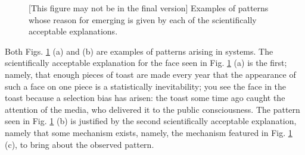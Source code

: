 \begin{figure}[h]
\caption{[This figure may not be in the final version] Examples of patterns whose reason for emerging is given by each of the scientifically acceptable explanations. } 
\label{fig:toast}
\end{figure}
Both Figs. \ref{fig:toast} (a) and (b) are examples of patterns arising in systems. The scientifically acceptable explanation for the face seen in Fig. \ref{fig:toast} (a) is the first; namely, that enough pieces of toast are made every year that the appearance of such a face on one piece is a statistically inevitability; you see the face in the toast because a selection bias has arisen: the toast some time ago caught the attention of the media, who delivered it to the public consciousness. The pattern seen in Fig. \ref{fig:toast} (b) is justified by the second scientifically acceptable explanation, namely that some mechanism exists, namely, the mechanism featured in Fig. \ref{fig:toast} (c), to bring about the observed pattern.

